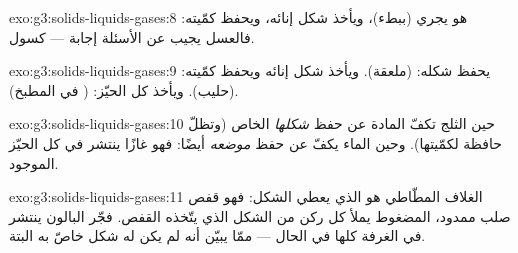 \begin{solution}{exo:g3:solids-liquids-gases:8}
هو يجري (ببطء)، ويأخذ شكل إنائه، ويحفظ كمّيته: فالعسل يجيب عن
الأسئلة إجابة  ---  كسول.
\end{solution}

\begin{solution}{exo:g3:solids-liquids-gases:9}
يحفظ شكله:  (ملعقة). ويأخذ شكل إنائه ويحفظ كمّيته:
 (حليب). ويأخذ كل الحيّز:  ( في المطبخ).
\end{solution}

\begin{solution}{exo:g3:solids-liquids-gases:10}
حين  الثلج تكفّ المادة عن حفظ \emph{شكلها} الخاص (وتظلّ
حافظة لكمّيتها). وحين  الماء يكفّ عن حفظ \emph{موضعه}
أيضًا: فهو غازًا ينتشر في كل الحيّز الموجود.
\end{solution}

\begin{solution}{exo:g3:solids-liquids-gases:11}
الغلاف المطّاطي هو الذي يعطي الشكل: فهو قفص صلب ممدود، 
المضغوط يملأ كل ركن من الشكل الذي يتّخذه القفص. فجّر البالون
ينتشر  في الغرفة كلها في الحال --- ممّا يبيّن أنه لم يكن
له شكل خاصّ به البتة.
\end{solution}
